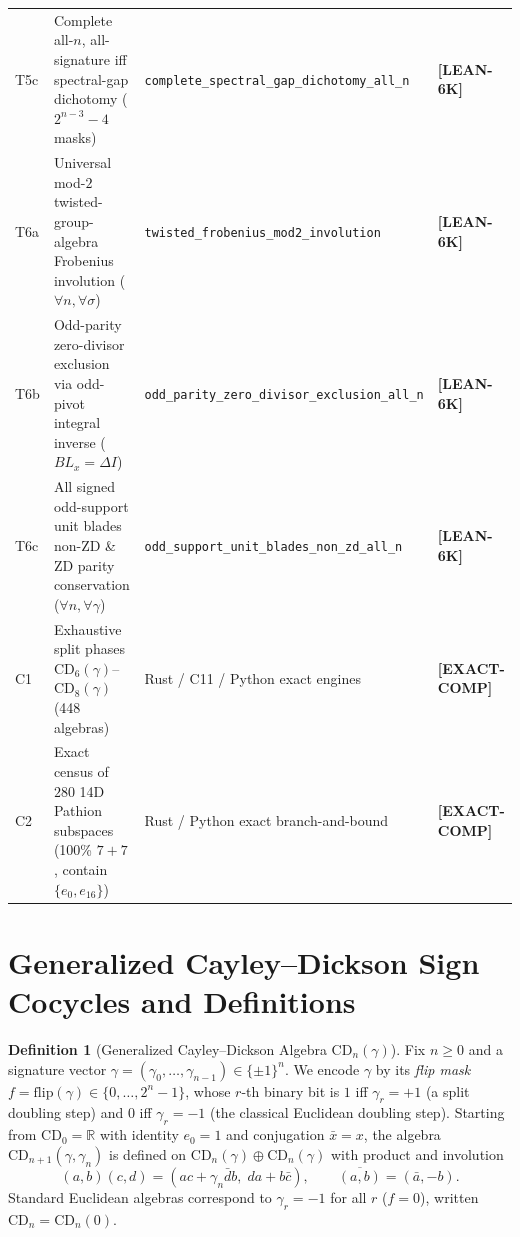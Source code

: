 \documentclass[11pt,reqno]{amsart}
\newcommand{\code}[1]{\textnormal{\texttt{\small\nolinkurl{#1}}}}
\theoremstyle{plain}
\theoremstyle{definition}
\newtheorem{definition}[theorem]{Definition}
\theoremstyle{remark}
\newcommand{\tagLean}{\mbox{\textsf{\textbf{\color{oiBlue}[LEAN-6K]}}}}
\newcommand{\tagComp}{\mbox{\textsf{\textbf{\color{oiGreen}[EXACT-COMP]}}}}
\newcommand{\CD}{\mathrm{CD}}
\newcommand{\R}{\mathbb{R}}
\newcommand{\flip}{\mathrm{flip}}
\begin{document}
\begin{table}[htbp]
\begin{tabularx}{\textwidth}{@{}l >{\raggedright\arraybackslash}p{6.0cm} >{\raggedright\arraybackslash}X l@{}}
T5c & Complete all-$n$, all-signature iff spectral-gap dichotomy ($2^{n-3}-4$ masks) & \code{complete_spectral_gap_dichotomy_all_n} & \tagLean \\
\addlinespace[2pt]
T6a & Universal mod-$2$ twisted-group-algebra Frobenius involution ($\forall n, \forall \sigma$) & \code{twisted_frobenius_mod2_involution} & \tagLean \\
T6b & Odd-parity zero-divisor exclusion via odd-pivot integral inverse ($B L_x = \Delta I$) & \code{odd_parity_zero_divisor_exclusion_all_n} & \tagLean \\
T6c & All signed odd-support unit blades non-ZD \& ZD parity conservation ($\forall n, \forall \gamma$) & \code{odd_support_unit_blades_non_zd_all_n} & \tagLean \\
\addlinespace[2pt]
C1 & Exhaustive split phases $\CD_6(\gamma)$--$\CD_8(\gamma)$ (448 algebras) & Rust / C11 / Python exact engines & \tagComp \\
C2 & Exact census of $280$ 14D Pathion subspaces (100\% $7+7$, contain $\{e_0,e_{16}\}$) & Rust / Python exact branch-and-bound & \tagComp \\
\bottomrule
\end{tabularx}
\end{table}

\section{Generalized Cayley--Dickson Sign Cocycles and Definitions}
\label{sec:setup}

\begin{definition}[Generalized Cayley--Dickson Algebra $\CD_n(\gamma)$]
\label{def:cd}
Fix $n \ge 0$ and a signature vector $\gamma = (\gamma_0, \dots, \gamma_{n-1}) \in \{\pm 1\}^n$.
We encode $\gamma$ by its \emph{flip mask} $f = \flip(\gamma) \in \{0, \dots, 2^n-1\}$, whose
$r$-th binary bit is $1$ iff $\gamma_r = +1$ (a split doubling step) and $0$ iff $\gamma_r = -1$
(the classical Euclidean doubling step). Starting from $\CD_0 = \R$ with identity $e_0 = 1$
and conjugation $\bar{x} = x$, the algebra $\CD_{n+1}(\gamma, \gamma_n)$ is defined on
$\CD_n(\gamma) \oplus \CD_n(\gamma)$ with product and involution
\begin{equation}
  (a, b)(c, d) = (ac + \gamma_n \bar{d}b,\; da + b\bar{c}),
  \qquad
  \overline{(a, b)} = (\bar{a}, -b).
\end{equation}
Standard Euclidean algebras correspond to $\gamma_r = -1$ for all $r$ ($f = 0$), written
$\CD_n = \CD_n(0)$.
\end{definition}
\end{document}
